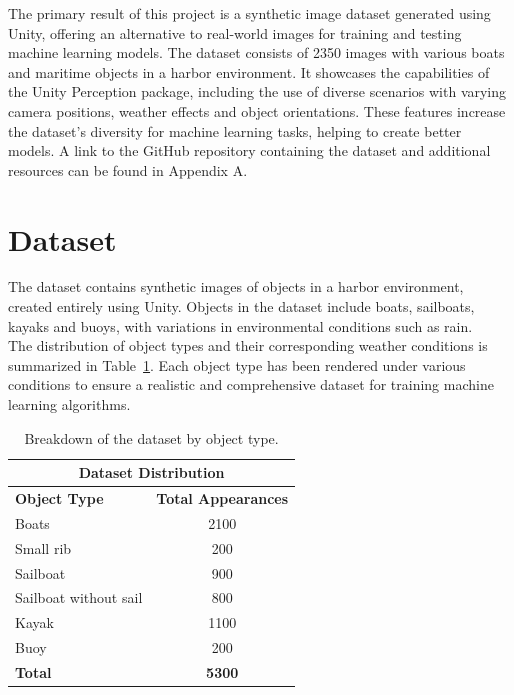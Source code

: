 The primary result of this project is a synthetic image dataset generated using Unity, offering an alternative to real-world images for training and testing machine learning models. The dataset consists of 2350 images with various boats and maritime objects in a harbor environment. It showcases the capabilities of the Unity Perception package, including the use of diverse scenarios with varying camera positions, weather effects and object orientations. These features increase the dataset's diversity for machine learning tasks, helping to create better models. A link to the GitHub repository containing the dataset and additional resources can be found in Appendix A.

\section{Dataset}
The dataset contains synthetic images of objects in a harbor environment, created entirely using Unity. Objects in the dataset include boats, sailboats, kayaks and buoys, with variations in environmental conditions such as rain.\\

\noindent The distribution of object types and their corresponding weather conditions is summarized in Table~\ref{tab:dataset_composition}. Each object type has been rendered under various conditions to ensure a realistic and comprehensive dataset for training machine learning algorithms.
 
\begin{table}[H]
\centering
\begin{tabular}{|l|c|}
\hline
\multicolumn{2}{|c|}{\textbf{Dataset Distribution}} \\ 
\hline
\textbf{Object Type} & \textbf{Total Appearances}\\ 
\hline
Boats         & 2100  \\ 
Small rib     & 200 \\
Sailboat      & 900     \\
Sailboat without sail     & 800    \\
Kayak        & 1100     \\ 
Buoy         & 200     \\ 

\hline
\textbf{Total}       & \textbf{5300} \\ 
\hline
\end{tabular}
\caption{Breakdown of the dataset by object type.}
\label{tab:dataset_composition}
\end{table}



